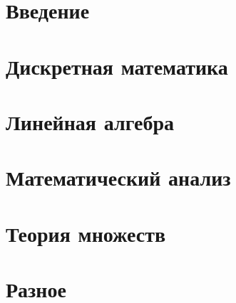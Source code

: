 \documentclass{report}
\begin{document}
\chapter*{Введение}

\tableofcontents
\chapter{Дискретная математика}

	
	
	

	
\chapter{Линейная алгебра}


	
	
	
	
	

	

	
	
	
	

	
	

	
\chapter{Математический анализ}

\chapter{Теория множеств}

	
	
	
	
\chapter{Разное}
\end{document}
